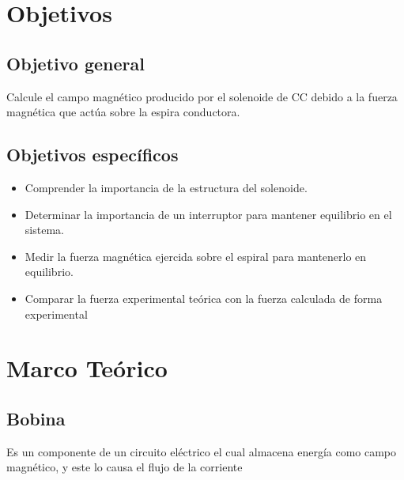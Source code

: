 \documentclass[twocolumn, 12pt]{article}
\begin{document}

\section{Objetivos}

\subsection{Objetivo general}

Calcule el campo magnético producido por el solenoide de CC
debido a la fuerza magnética que actúa sobre la espira
conductora.

\subsection{Objetivos específicos}

\begin{itemize}[label=$\triangleright$]
	\item Comprender la importancia de la estructura del solenoide.
	\item Determinar la importancia de un interruptor para mantener
	      equilibrio en el sistema.
	\item Medir la fuerza magnética ejercida sobre el espiral para
	      mantenerlo en equilibrio.
	\item Comparar la fuerza experimental teórica con la fuerza
	      calculada de forma experimental
\end{itemize}

\section{Marco Teórico}

\subsection*{Bobina}

Es un componente de un circuito eléctrico el cual almacena
energía como campo magnético, y este lo causa el flujo de
la corriente
\end{document}
